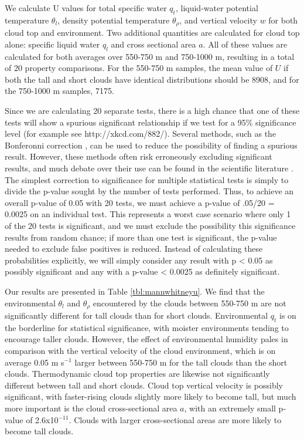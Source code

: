 \documentclass[acp]{copernicus}
\begin{document}
We calculate U values for total specific water $q_t$, liquid-water potential 
temperature $\theta_l$, density potential temperature $\theta_\rho$, and 
vertical velocity $w$ for both cloud top and environment.  Two additional 
quantities are calculated for cloud top alone: specific liquid water $q_l$ and 
cross sectional area $a$.  All of these values are calculated for both averages 
over 550-750 m and 750-1000 m, resulting in a total of 20 property comparisons.
For the 550-750 m samples, the mean value of $U$ if both the tall and short 
clouds have identical distributions should be 8908, and for the 750-1000 m 
samples, 7175.  

Since we are calculating 20 separate tests, there is a high chance that one of 
these tests will show a spurious significant relationship if we test for a 95\% 
significance level (for example see http://xkcd.com/882/).  Several methods, 
such as the Bonferonni correction \citep{Shaffer1995}, can be used to reduce 
the possibility of finding a spurious result.  However, these methods often 
risk erroneously excluding significant results, and much debate over their use 
can be found in the scientific literature \citep{Perneger1998, Nakagawa2004}.  
The simplest correction to significance for multiple statistical tests is simply 
to divide the p-value sought by the number of tests performed.  Thus, to 
achieve an overall p-value of 0.05 with 20 tests, we must achieve a p-value of 
.05/20 = 0.0025 on an individual test. This represents a worst case scenario 
where only 1 of the 20 tests is significant, and we must exclude the 
possibility this significance results from random chance; if more than one test 
is significant, the p-value needed to exclude false positives is reduced.  
Instead of calculating these probabilities explicitly, we will simply consider 
any result with p < 0.05 as possibly significant and any with a 
p-value < 0.0025 as definitely significant.  

Our results are presented in Table \ref{tbl:mannwhitneyu}.  We find that the 
environmental $\theta_l$ and $\theta_\rho$ encountered by the clouds between 
550-750 m are not significantly different for tall clouds than for short 
clouds.  Environmental $q_t$ is on the borderline for statistical significance, 
with moister environments tending to encourage taller clouds.  However, the 
effect of environmental humidity pales in comparison with the vertical velocity 
of the cloud environment, which is on average 0.05 m s$^{-1}$ larger between 
550-750 m for the tall clouds than the short clouds.  Thermodynamic cloud top 
properties are likewise not significantly different between tall and short 
clouds.  Cloud top vertical velocity is possibly significant, with 
faster-rising clouds slightly more likely to become tall, but much more 
important is the cloud cross-sectional area $a$, with an extremely small 
p-value of 2.6x10$^{-11}$.  Clouds with larger cross-sectional areas are more 
likely to become tall clouds.
\end{document}
